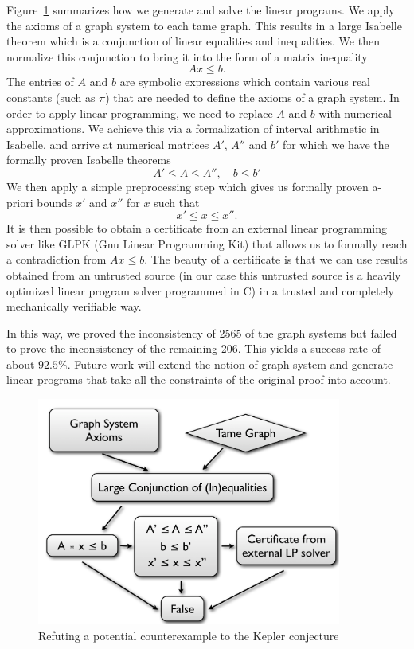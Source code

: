 \documentclass[11pt]{amsart}
\begin{document}
Figure~\ref{fig:lpapproach} summarizes how we generate and solve the linear programs.
We apply the axioms of a graph system to each tame graph. This results in a large Isabelle theorem which is a conjunction of
linear equalities and inequalities. We then normalize this conjunction
to bring it into the form of a matrix inequality
\begin{equation}
A  x \leq b.
\end{equation}
The entries of $A$ and $b$ are symbolic expressions which contain various real constants (such as $\pi$) that are needed to
define the axioms of a graph system. In order to apply linear programming, 
we need to replace $A$ and $b$ with numerical approximations. We achieve this via a formalization of 
interval arithmetic in Isabelle, and arrive at numerical matrices $A'$, $A''$ and $b'$ for which we have the formally proven 
Isabelle theorems 
\begin{equation}
A' \leq  A  \leq A'', \quad b \leq b'
\end{equation}
We then apply a simple preprocessing step which gives us formally proven a-priori bounds $x'$ and $x''$ for $x$ such
that 
\begin{equation}
x' \leq x \leq x''.
\end{equation}
It is then possible to obtain a certificate from an external linear programming solver like GLPK (Gnu Linear Programming Kit) that allows us to formally reach a contradiction from $A x \leq b$. The beauty of a certificate is 
that we can use results obtained from an untrusted source (in our case this untrusted source is a 
heavily optimized linear program solver programmed in C) in a trusted and completely mechanically verifiable way.

In this way, we proved the inconsistency of 2565 of the graph systems but failed to prove the inconsistency of the remaining 206. 
This yields a success rate of about $92.5\%$. Future work will extend the notion of graph system and  generate linear programs
that take all the constraints of the original proof into account.


\begin{figure}
\begin{center}
\includegraphics[width=10cm]{lpapproach}
\end{center}
\caption{Refuting a potential counterexample to the Kepler conjecture}
\label{fig:lpapproach}
\end{figure}
\end{document}
